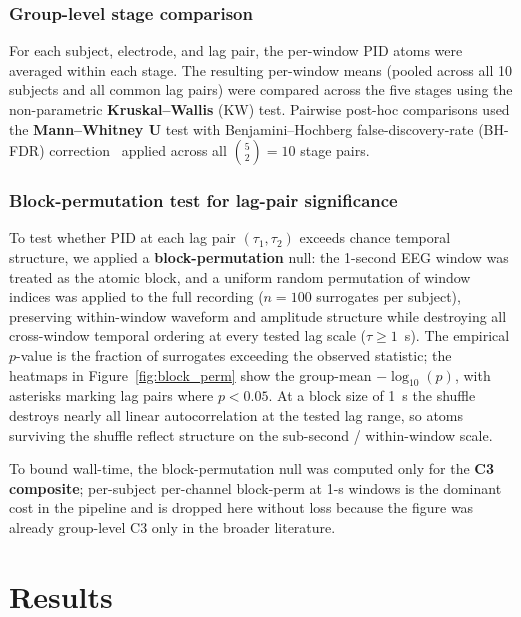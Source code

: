 \documentclass[11pt,a4paper]{article}
\begin{document}
\subsubsection{Group-level stage comparison}

For each subject, electrode, and lag pair, the per-window PID atoms were
averaged within each stage.  The resulting per-window means (pooled across
all 10 subjects and all common lag pairs) were compared across the five
stages using the non-parametric \textbf{Kruskal--Wallis} (KW) test.
Pairwise post-hoc comparisons used the \textbf{Mann--Whitney U} test with
Benjamini--Hochberg false-discovery-rate (BH-FDR)
correction~\citep{benjamini1995fdr} applied across all $\binom{5}{2} = 10$
stage pairs.

\subsubsection{Block-permutation test for lag-pair significance}
\label{sec:blockperm}

To test whether PID at each lag pair $(\tau_1, \tau_2)$ exceeds chance
temporal structure, we applied a \textbf{block-permutation} null: the
1-second EEG window was treated as the atomic block, and a uniform random
permutation of window indices was applied to the full recording ($n = 100$
surrogates per subject), preserving within-window waveform and amplitude
structure while destroying all cross-window temporal ordering at every
tested lag scale ($\tau \geq 1$~s).  The empirical $p$-value is the
fraction of surrogates exceeding the observed statistic; the heatmaps in
Figure~\ref{fig:block_perm} show the group-mean $-\log_{10}(p)$, with
asterisks marking lag pairs where $p < 0.05$.  At a block size of 1~s the
shuffle destroys nearly all linear autocorrelation at the tested lag
range, so atoms surviving the shuffle reflect structure on the
sub-second / within-window scale.

To bound wall-time, the block-permutation null was computed only for the
\textbf{C3 composite}; per-subject per-channel block-perm at 1-s windows
is the dominant cost in the pipeline and is dropped here without loss
because the figure was already group-level C3 only in the broader
literature.

\section{Results}
\end{document}
